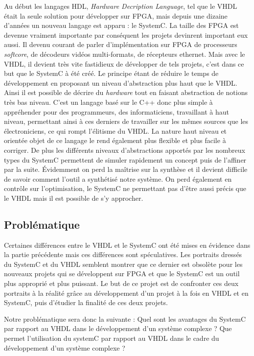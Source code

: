\documentclass[a4paper,12pt]{article}
\begin{document}
Au début les langages HDL, \textit{Hardware Decription Language}, tel que le VHDL était la seule solution pour développer sur FPGA, mais depuis une dizaine d'années un nouveau langage est apparu : le SystemC. La taille des FPGA est devenue vraiment importante par conséquent les projets devinrent important eux aussi. Il devenu courant de parler d'implémentation sur FPGA de processeurs \textit{softcore}, de décodeurs vidéos multi-formats, de récepteurs ethernet. Mais avec le VHDL, il devient très vite fastidieux de développer de tels projets, c'est dans ce but que le SystemC à été créé. Le principe étant de réduire le temps de développement en proposant un niveau d'abstraction plus haut que le VHDL. Ainsi il est possible de décrire du \textit{hardware} tout en faisant abstraction de notions très bas niveau. C'est un langage basé sur le C++ donc plus simple à appréhender pour des programmeurs, des informaticiens, travaillant à haut niveau, permettant ainsi à ces derniers de travailler sur les mêmes sources que les électroniciens, ce qui rompt l'élitisme du VHDL. La nature haut niveau et orientée objet de ce langage le rend également plus flexible et plus facile à corriger. De plus les différents niveaux d'abstractions apportés par les nombreux types du SystemC permettent de simuler rapidement un concept puis de l'affiner par la suite. Évidemment on perd la maîtrise sur la synthèse et il devient difficile de savoir comment l'outil a synthétisé notre système. On perd également en contrôle sur l'optimisation, le SystemC ne permettant pas d'être aussi précis que le VHDL mais il est possible de s'y approcher. 

\subsection{Problématique}

Certaines différences entre le VHDL et le SystemC ont été mises en évidence dans la partie précédente mais ces différences sont spéculatives. Les portraits dressés du SystemC et du VHDL semblent montrer que ce dernier est obsolète pour les nouveaux projets qui se développent sur FPGA et que le SystemC est un outil plus approprié et plus puissant. Le but de ce projet est de confronter ces deux portraits à la réalité grâce au développement d'un projet à la fois en VHDL et en SystemC, puis d'étudier la finalité de ces deux projets.\newline

Notre problématique sera donc la suivante : Quel sont les avantages du SystemC par rapport au VHDL dans le développement d'un système complexe ?  
Que permet l’utilisation du systemC par rapport au VHDL dans le cadre du développement d’un système complexe ? \newline
\end{document}
